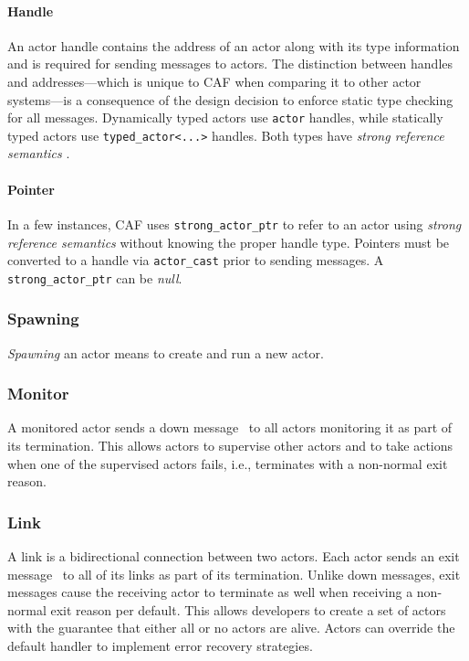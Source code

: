 \paragraph{Handle}
\label{actor-handle}

An actor handle contains the address of an actor along with its type
information and is required for sending messages to actors. The distinction
between handles and addresses---which is unique to CAF when comparing it to
other actor systems---is a consequence of the design decision to enforce static
type checking for all messages. Dynamically typed actors use \lstinline^actor^
handles, while statically typed actors use \lstinline^typed_actor<...>^
handles. Both types have \emph{strong reference semantics}
.

\paragraph{Pointer}
\label{actor-pointer}

In a few instances, CAF uses \lstinline^strong_actor_ptr^ to refer to an actor
using \emph{strong reference semantics}  without
knowing the proper handle type. Pointers must be converted to a handle via
\lstinline^actor_cast^  prior to sending messages. A
\lstinline^strong_actor_ptr^ can be \emph{null}.

\subsubsection{Spawning}

\emph{Spawning} an actor means to create and run a new actor.

\subsubsection{Monitor}
\label{monitor}

A monitored actor sends a down message~ to all actors
monitoring it as part of its termination. This allows actors to supervise other
actors and to take actions when one of the supervised actors fails, i.e.,
terminates with a non-normal exit reason.

\subsubsection{Link}
\label{link}

A link is a bidirectional connection between two actors. Each actor sends an
exit message~ to all of its links as part of its termination.
Unlike down messages, exit messages cause the receiving actor to terminate as
well when receiving a non-normal exit reason per default. This allows
developers to create a set of actors with the guarantee that either all or no
actors are alive. Actors can override the default handler to implement error
recovery strategies.

